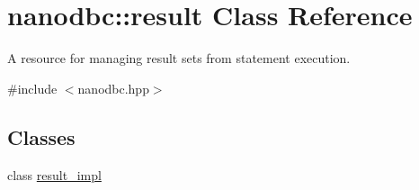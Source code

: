 \hypertarget{classnanodbc_1_1result}{}\section{nanodbc\+::result Class Reference}
\label{classnanodbc_1_1result}


A resource for managing result sets from statement execution.  




{\ttfamily \#include $<$nanodbc.\+hpp$>$}

\subsection*{Classes}
\begin{DoxyCompactItemize}
\item 
class \mbox{\hyperlink{classnanodbc_1_1result_1_1result__impl}{result\+\_\+impl}}
\end{DoxyCompactItemize}
